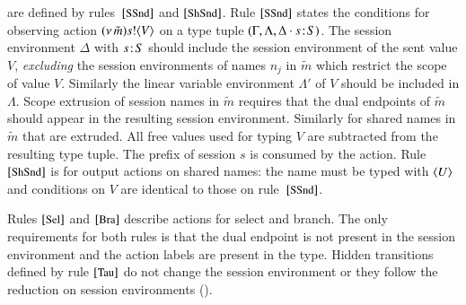  are defined by rules~$\eltsrule{SSnd}$
and $\eltsrule{ShSnd}$.  
Rule $\eltsrule{SSnd}$ states the conditions for observing action
$(\nu\, \tilde{m}) s ! \langle V \rangle$ on a type tuple 
$(\Gamma, \Lambda, \Delta\cdot s \! : \! S)$. 
The session environment $\Delta$ with $s \! : \! S$ 
should include the session environment of the sent value $V$, 
{\em excluding} the session environments of names $n_j$ 
in $\tilde{m}$ which restrict the scope of value $V$. 
Similarly the linear variable environment 
$\Lambda'$ of $V$ should be included in $\Lambda$. 
Scope extrusion of session names in $\tilde{m}$ requires
that the dual endpoints of $\tilde{m}$ should appear in
the resulting session environment. Similarly for shared 
names in $\tilde{m}$ that are extruded.  
All free values used for typing $V$ are subtracted from the
resulting type tuple. The prefix of session $s$ is consumed
by the action.
Rule $\eltsrule{ShSnd}$ is for output actions on shared names:
the name must be typed with $\langle U \rangle$ and conditions on $V$ are identical to those
on rule~$\eltsrule{SSnd}$.

Rules $\eltsrule{Sel}$ and $\eltsrule{Bra}$ describe actions for
select and branch. The only requirements for both
rules is that the dual endpoint is not present in the session
environment and the action labels are present
in the type.
Hidden transitions defined by rule $\eltsrule{Tau}$ 
do not change the session environment or they follow the reduction on session
environments (). 




